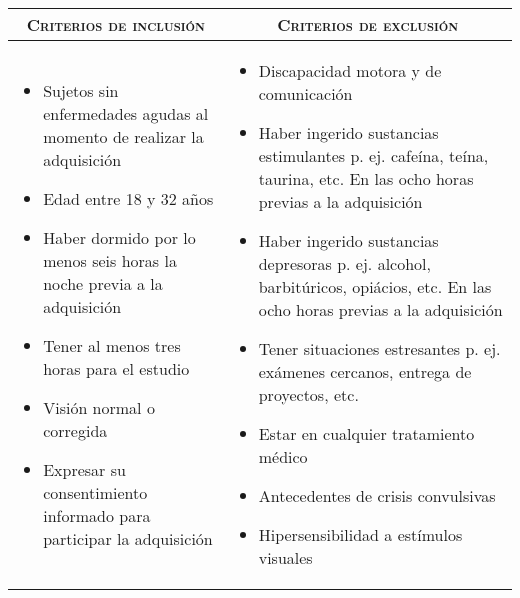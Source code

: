 \small
\begin{tabular}{p{}p{}}
	\multicolumn{1}{c}{\textsc{Criterios de inclusión}}
	  & \multicolumn{1}{c}{\textsc{Criterios de exclusión}}\\
	\hline
	\begin{itemize}
		\item Sujetos sin enfermedades agudas al momento de realizar la adquisición
		\item Edad entre 18 y 32 años
		\item Haber dormido por lo menos seis horas la noche previa a la adquisición
		\item Tener al menos tres horas para el estudio
		\item Visión normal o corregida
		\item Expresar su consentimiento informado para participar la adquisición
	\end{itemize}&
	\begin{itemize}
		\item Discapacidad motora y de comunicación
		\item Haber ingerido sustancias estimulantes p. ej. cafeína, teína, taurina, etc. En las ocho horas previas a la adquisición
		\item Haber ingerido sustancias depresoras p. ej. alcohol, barbitúricos, opiácios, etc. En las ocho horas previas a la adquisición
		\item Tener situaciones estresantes p. ej. exámenes cercanos, entrega de proyectos, etc.
		\item Estar en cualquier tratamiento médico
		\item Antecedentes de crisis convulsivas
		\item Hipersensibilidad a estímulos visuales
	\end{itemize}\\
\hline
\end{tabular}

